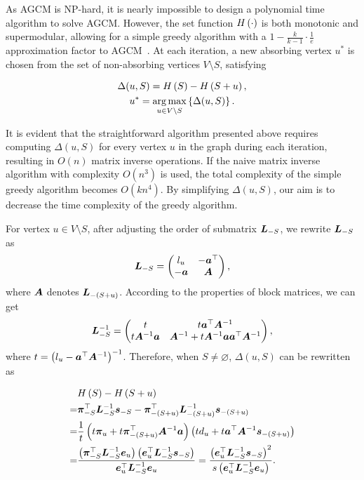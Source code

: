 \documentclass[10pt,journal,compsoc,twocolumn,twoside]{IEEEtran}
\begin{document}
As AGCM is NP-hard, it is nearly impossible to design a polynomial time algorithm to solve AGCM.
However, the set function \(H\left(\cdot\right)\) is both monotonic and supermodular, allowing for a simple greedy algorithm with a \(1-\frac{k}{k-1}\cdot\frac{1}{e}\) approximation factor to AGCM~\cite{NeWoFi78}.
At each iteration, a new absorbing vertex \(u^*\) is chosen from the set of non-absorbing vertices \(V\setminus S\), satisfying

\begin{gather*}
    \Delta(u,S)=H\left(S\right)-H\left(S+u\right),\\
    u^*=\operatorname*{arg\,max}_{u\in V\setminus S}\left\{\Delta(u,S) \right\}.
\end{gather*}

It is evident that the straightforward algorithm presented above requires computing \(\Delta(u,S)\) for every vertex \(u\) in the graph during each iteration, resulting in \(O(n)\) matrix inverse operations.
If the naive matrix inverse algorithm with complexity \(O(n^3)\) is used, the total complexity of the simple greedy algorithm becomes \(O(kn^4)\).
By simplifying \(\Delta(u,S)\), our aim is to decrease the time complexity of the greedy algorithm.

For vertex \(u\in V\setminus S\), after adjusting the order of submatrix \(\boldsymbol{L}_{-S}\), we rewrite \(\boldsymbol{L}_{-S}\) as
\begin{equation*}
    \boldsymbol{L}_{-S}=\begin{pmatrix}l_u & -\boldsymbol{a}^\top \\-\boldsymbol{a}&\boldsymbol{A}\end{pmatrix},
\end{equation*}
where \(\boldsymbol{A}\) denotes \(\boldsymbol{L}_{-(S+u)}\).
According to the properties of block matrices, we can get
\begin{equation*}
    \boldsymbol{L}_{-S}^{-1}=\begin{pmatrix}
        t & t\boldsymbol{a}^\top\boldsymbol{A}^{-1} \\t\boldsymbol{A}^{-1}\boldsymbol{a}&\boldsymbol{A}^{-1}+t\boldsymbol{A}^{-1}\boldsymbol{a}\boldsymbol{a}^\top\boldsymbol{A}^{-1}
    \end{pmatrix},
\end{equation*}
where \(t={\left( l_u-\boldsymbol{a}^\top{\boldsymbol{A}}^{-1} \right)}^{-1}\).
Therefore, when \(S\neq\varnothing\), \(\Delta(u,S)\) can be rewritten as

\begin{equation}\label{eq:margin-deriv}
    \begin{split}
        &H\left(S\right)-H\left(S+u\right)\\
        =&\boldsymbol{\pi}_{-S}^\top\boldsymbol{L}_{-S}^{-1}\boldsymbol{s}_{-S}-\boldsymbol{\pi}_{-(S+u)}^\top\boldsymbol{L}_{-(S+u)}^{-1}\boldsymbol{s}_{-(S+u)}\\
        =&\frac1t\left( t\boldsymbol{\pi}_u+t\boldsymbol{\pi}_{-(S+u)}^\top\boldsymbol{A}^{-1}\boldsymbol{a} \right)\left( td_u+t\boldsymbol{a}^\top\boldsymbol{A}^{-1}\boldsymbol{s}_{-(S+u)} \right)\\
        =&\frac{\left( \boldsymbol{\pi}_{-S}^\top\boldsymbol{L}_{-S}^{-1}\boldsymbol{e}_u \right)\left( \boldsymbol{e}_u^\top\boldsymbol{L}_{-S}^{-1}\boldsymbol{s}_{-S} \right)}{\boldsymbol{e}_u^\top\boldsymbol{L}_{-S}^{-1}\boldsymbol{e}_u}=\frac{\left( \boldsymbol{e}_u^\top\boldsymbol{L}_{-S}^{-1}\boldsymbol{s}_{-S} \right)^2}{s\left( \boldsymbol{e}_u^\top\boldsymbol{L}_{-S}^{-1}\boldsymbol{e}_u \right)}.
    \end{split}
\end{equation}
\end{document}
